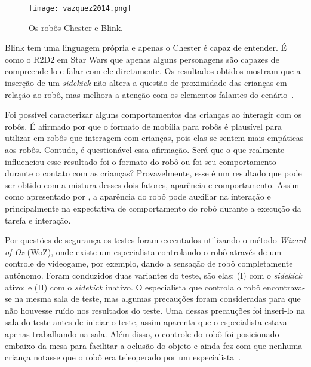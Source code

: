 \begin{figure}[ht!]
	\centering
	\begin{minipage}{0.4\textwidth}
		\caption{Os robôs Chester e Blink.}
		\texttt{[image: vazquez2014.png]}
		\label{fig:vazquez}
	\end{minipage}
\end{figure}

Blink tem uma linguagem própria e apenas o Chester é capaz de entender. É como o R2D2 em Star Wars que apenas alguns personagens são capazes de compreende-lo e falar com ele diretamente. Os resultados obtidos mostram que a inserção de um \emph{sidekick} não altera a questão de proximidade das crianças em relação ao robô, mas melhora a atenção com os elementos falantes do cenário~\cite{vazquez:2014}.

Foi possível caracterizar alguns comportamentos das crianças ao interagir com os robôs. É afirmado por \textcite{vazquez:2014} que o formato de mobília para robôs é plausível para utilizar em robôs que interagem com crianças, pois elas se sentem mais empáticas aos robôs. Contudo, é questionável essa afirmação. Será que o que realmente influenciou esse resultado foi o formato do robô ou foi seu comportamento durante o contato com as crianças? Provavelmente, esse é um resultado que pode ser obtido com a mistura desses dois fatores, aparência e comportamento. Assim como apresentado por \textcite{joosse:2011}, a aparência do robô pode auxiliar na interação e principalmente na expectativa de comportamento do robô durante a execução da tarefa e interação.

Por questões de segurança os testes foram executados utilizando o método \emph{Wizard of Oz} (WoZ), onde existe um especialista controlando o robô através de um controle de videogame, por exemplo, dando a sensação de robô completamente autônomo. Foram conduzidos duas variantes do teste, são elas: (I) com o \emph{sidekick} ativo; e (II) com o \emph{sidekick} inativo. O especialista que controla o robô encontrava-se na mesma sala de teste, mas algumas precauções foram consideradas para que não houvesse ruído nos resultados do teste. Uma dessas precauções foi inseri-lo na sala do teste antes de iniciar o teste, assim aparenta que o especialista estava apenas trabalhando na sala. Além disso, o controle do robô foi posicionado embaixo da mesa para facilitar a oclusão do objeto e ainda fez com que nenhuma criança notasse que o robô era teleoperado por um especialista~\cite{vazquez:2014}.

